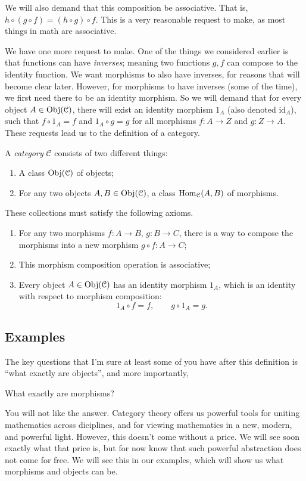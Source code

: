 \documentclass[11pt, letterpaper]{article}
\begin{document}
We will also demand that this composition be associative. That is, $h\circ (g\circ f)=(h\circ g)\circ f$. This is a very reasonable request to make, as most things in math are associative.

We have one more request to make. One of the things we considered earlier is that functions can have \emph{inverses}; meaning two functions $g,f$ can compose to the identity function. We want morphisms to also have inverses, for reasons that will become clear later. However, for morphisms to have inverses (some of the time), we first need there to be an identity morphism. So we will demand that for every object $A\in \operatorname{Obj}(\mathcal{C} ) $, there will exist an identity morphism $1_A$ (also denoted $\mathrm{id} _A$), such that $f\circ 1_A=f$ and $1_A\circ g=g$ for all morphisms $f : A \to Z$ and $g : Z \to A$. These requests lead us to the definition of a category.

\begin{definition}\label{dfn:2}
	A \emph{category} $\mathcal{C} $ consists of two different things:
	\begin{enumerate}
		\item A class $\operatorname{Obj}(\mathcal{C} ) $ of objects;
		\item For any two objects $A,B\in\operatorname{Obj}(\mathcal{C} ) $, a class $\operatorname{Hom}_{\mathcal{C} }(A, B) $ of morphisms. 
	\end{enumerate}
	These collections must satisfy the following axioms.
	\begin{enumerate}
		\item For any two morphisms $f : A \to B$, $g : B \to C$, there is a way to compose the morphisms into a new morphism $g\circ f : A \to C$;
		\item This morphism composition operation is associative;
		\item Every object $A\in \operatorname{Obj}(\mathcal{C} ) $ has an identity morphism $1_{A} $, which is an identity with respect to morphism composition:
			\[
				1_A \circ f=f,\qquad g\circ 1_A=g
			.\]
	\end{enumerate}
\end{definition}

\subsection{Examples}

The key questions that I'm sure at least some of you have after this definition is ``what exactly are objects'', and more importantly,
\begin{displayquote}
	What exactly are morphisms?
\end{displayquote}
You will not like the answer. Category theory offers us powerful tools for uniting mathematics across diciplines, and for viewing mathematics in a new, modern, and powerful light. However, this doesn't come without a price. We will see soon exactly what that price is, but for now know that such powerful abstraction does not come for free. We will see this in our examples, which will show us what morphisms and objects can be.
\end{document}
